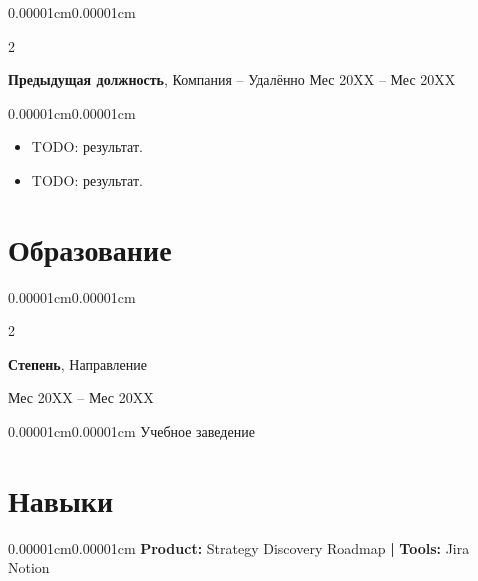 \documentclass[10pt, a4paper]{article}
\newenvironment{highlights}{
    \begin{itemize}[topsep=0.08cm, parsep=0.08cm, partopsep=0pt, itemsep=0pt, leftmargin=10pt]
}{
    \end{itemize}
}
\newenvironment{onecolentry}{\begin{adjustwidth}{0.00001cm}{0.00001cm}}{\end{adjustwidth}}
\newenvironment{twocolentry}[2][]{
    \onecolentry
    \def\secondColumn{#2}
    \setcolumnwidth{\fill, 4.5cm}
    \begin{paracol}{2}
}{
    \switchcolumn \raggedleft \secondColumn
    \end{paracol}
    \endonecolentry
}
\begin{document}
    \vspace{0.15cm}
    \begin{twocolentry}{Мес 20XX -- Мес 20XX}
        \textbf{Предыдущая должность}, Компания -- Удалённо\end{twocolentry}
    \vspace{0.08cm}
    \begin{onecolentry}
        \begin{highlights}
            \item TODO: результат.
            \item TODO: результат.
        \end{highlights}
    \end{onecolentry}

    \vspace{0.15cm}
    \section{Образование}

    \begin{twocolentry}{Мес 20XX -- Мес 20XX}
        \textbf{Степень}, Направление
    \end{twocolentry}
    \vspace{0.05cm}
    \begin{onecolentry}
        Учебное заведение
    \end{onecolentry}

    \vspace{0.15cm}
    \section{Навыки}

    \begin{onecolentry}
        \textbf{Product:} Strategy \textperiodcentered{} Discovery \textperiodcentered{} Roadmap \textbf{|} \textbf{Tools:} Jira \textperiodcentered{} Notion
    \end{onecolentry}
\end{document}
